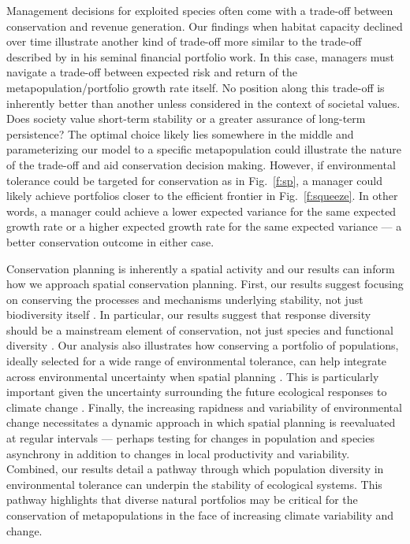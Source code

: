 \documentclass[12pt,english]{article}
\begin{document}
\begin{spacing}{1.9}
Management decisions for exploited species often come with a trade-off between conservation and revenue generation. Our findings when habitat capacity declined over time illustrate another kind of trade-off more similar to the trade-off described by \citet{markowitz1952} in his seminal financial portfolio work. In this case, managers must navigate a trade-off between expected risk and return of the metapopulation/portfolio growth rate itself. No position along this trade-off is inherently better than another unless considered in the context of societal values. Does society value short-term stability or a greater assurance of long-term persistence? The optimal choice likely lies somewhere in the middle and parameterizing our model to a specific metapopulation could illustrate the nature of the trade-off and aid conservation decision making. However, if environmental tolerance could be targeted for conservation as in Fig.~\ref{f:sp}, a manager could likely achieve portfolios closer to the efficient frontier in Fig.~\ref{f:squeeze}. In other words, a manager could achieve a lower expected variance for the same expected growth rate or a higher expected growth rate for the same expected variance --- a better conservation outcome in either case.

Conservation planning is inherently a spatial activity \citep{pressey2007} and our results can inform how we approach spatial conservation planning. First, our results suggest focusing on conserving the processes and mechanisms underlying stability, not just biodiversity itself \citep{pressey2007, beechie2013}. In particular, our results suggest that response diversity should be a mainstream element of conservation, not just species and functional diversity \citep{mori2013}. Our analysis also illustrates how conserving a portfolio of populations, ideally selected for a wide range of environmental tolerance, can help integrate across environmental uncertainty when spatial planning \citep{ando2012}. This is particularly important given the uncertainty surrounding the future ecological responses to climate change \citep{walther2002}. Finally, the increasing rapidness and variability of environmental change necessitates a dynamic approach in which spatial planning is reevaluated at regular intervals \citep{hannah2002a} --- perhaps testing for changes in population and species asynchrony in addition to changes in local productivity and variability. Combined, our results detail a pathway through which population diversity in environmental tolerance can underpin the stability of ecological systems. This pathway highlights that diverse natural portfolios may be critical for the conservation of metapopulations in the face of increasing climate variability and change.


\end{spacing}
\end{document}
